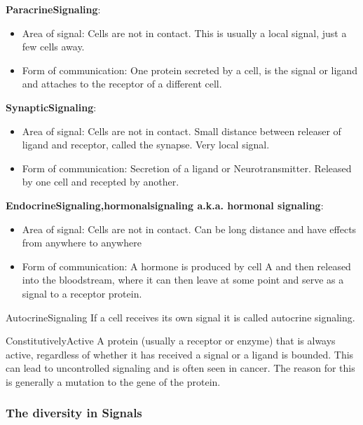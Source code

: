 \documentclass[../main.tex]{subfiles}
\begin{document}
\textbf{\gls{ParacrineSignaling}}:
\begin{itemize}
	\item Area of signal: Cells are not in contact. This is usually a local signal, just a few cells away.
	\item Form of communication: One protein secreted by a cell, is the signal or ligand and attaches to the receptor of a different cell.
\end{itemize}


\textbf{\gls{SynapticSignaling}}:
\begin{itemize}
	\item Area of signal: Cells are not in contact. Small distance between releaser of ligand and receptor, called the synapse. Very local signal.
	\item Form of communication: Secretion of a ligand or \gls{Neurotransmitter}. Released by one cell and recepted by another.
\end{itemize}


\textbf{\gls{EndocrineSignaling,hormonalsignaling} a.k.a. hormonal signaling}:
\begin{itemize}
	\item Area of signal: Cells are not in contact. Can be long distance and have effects from anywhere to anywhere
	\item Form of communication: A hormone is produced by cell A and then released into the bloodstream, where it can then leave at some point and serve as a signal to a receptor protein.
\end{itemize}

\begin{DefWithTitle}{\gls{AutocrineSignaling}}
	If a cell receives its own signal it is called autocrine signaling.
\end{DefWithTitle}

\begin{DefWithTitle}{\gls{ConstitutivelyActive}}
	A protein (usually a receptor or enzyme) that is always active, regardless of whether it has received a signal or a ligand is bounded. This can lead to uncontrolled signaling and is often seen in cancer. The reason for this is generally a mutation to the gene of the protein. 
\end{DefWithTitle}

\subsubsection{The diversity in Signals}
\end{document}
